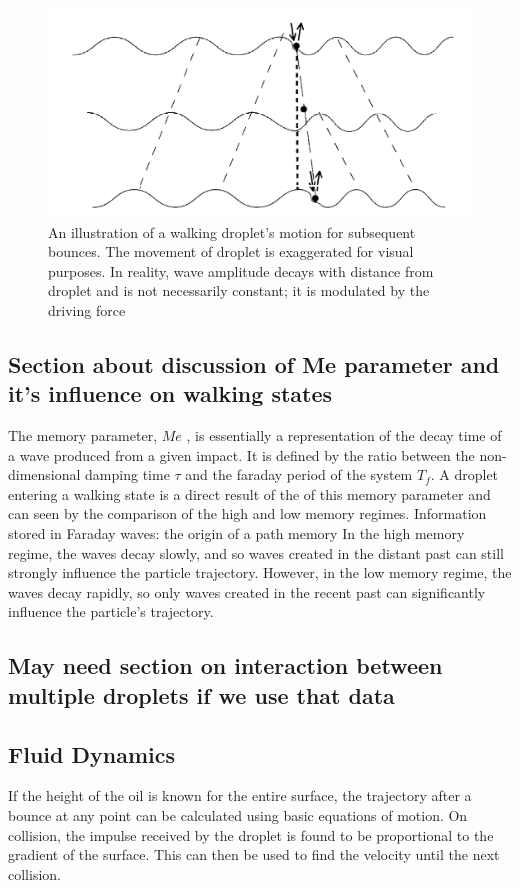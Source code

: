 \begin{figure}[ht]
\includegraphics[width=12cm]{theory/walkingDroplet}
\centering
\caption{An illustration of a walking droplet's motion for subsequent bounces. The movement of droplet is exaggerated for visual purposes. In reality, wave amplitude decays with distance from droplet and is not necessarily constant; it is modulated by the driving force }
\centering
\label{walker}

\end{figure}

\subsection{Section about discussion of Me parameter and it's influence on walking states}
The memory parameter,  $Me$ , is essentially a representation of the decay time of a wave produced from a given impact. It is defined by the ratio between the non-dimensional damping time $\tau$ and the faraday period of the system $T_f$.
A droplet entering a walking state is a direct result of the of this memory parameter and can seen by the comparison of the high and low memory regimes. {Information stored in Faraday waves: the origin of a path memory}
In the high memory regime, the waves decay slowly, and so waves created in the distant past can still strongly influence the particle trajectory. However, in the low memory regime, the waves decay rapidly, so only waves created in the recent past can significantly influence the particle's trajectory. 


\subsection{May need section on interaction between multiple droplets if we use that data}
\subsection{Fluid Dynamics}
If the height of the oil is known for the entire surface, the trajectory after a bounce at any point can be calculated using basic equations of motion. On collision, the impulse received by the droplet is found to be proportional to the gradient of the surface. This can then be used to find the velocity until the next collision. 